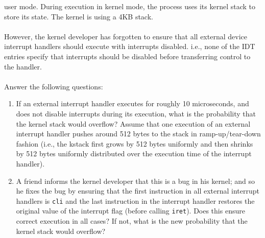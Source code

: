 \begin{enumerate}
user mode. During execution in kernel mode, the process uses its kernel stack to store
its state. The kernel is using a 4KB stack.\\\\
However, the kernel developer has forgotten to ensure that all external device interrupt
handlers should execute with interrupts disabled. i.e., none of the IDT entries specify
that interrupts should be disabled before transferring control to the handler.\\\\
Answer the following questions:
\begin{enumerate}
\item If an external interrupt handler executes for roughly 10 microseconds, and does
not disable interrupts during its execution, what is the probability that the kernel
stack would overflow? Assume that one execution
of an external interrupt handler pushes around 512 bytes to the stack in ramp-up/tear-down
fashion (i.e., the kstack first grows by 512 bytes uniformly and then shrinks by 512
bytes uniformly distributed over the execution time of the interrupt handler).
\item A friend informs the kernel developer that this is a bug in
his kernel; and so he
fixes the bug by ensuring that the first instruction in all external interrupt handlers
is {\tt cli} and the last instruction in the interrupt handler
restores the original value of the interrupt flag (before calling {\tt iret}). Does this
ensure correct execution in all cases? If not, what is the new probability that the
kernel stack would overflow?
\end{enumerate}


\end{enumerate}
